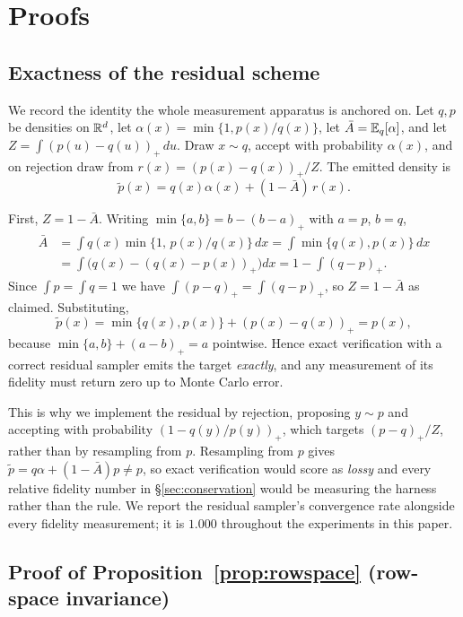 \section{Proofs}
\label{app:proofs}

\subsection{Exactness of the residual scheme}
\label{app:exactness}

We record the identity the whole measurement apparatus is anchored on. Let $q, p$ be densities on
$\mathbb{R}^d$, let $\alpha(x) = \min\{1, p(x)/q(x)\}$, let $\bar{A} = \mathbb{E}_{q}[\alpha]$, and let
$Z = \int (p(u) - q(u))_+ \, du$. Draw $x \sim q$, accept with probability $\alpha(x)$, and on
rejection draw from $r(x) = (p(x) - q(x))_+ / Z$. The emitted density is
\[
\tilde{p}(x) = q(x)\alpha(x) + (1 - \bar{A})\,r(x).
\]

First, $Z = 1 - \bar{A}$. Writing $\min\{a,b\} = b - (b-a)_+$ with $a = p$, $b = q$,
\begin{align*}
\bar{A} &= \int q(x)\min\{1,\, p(x)/q(x)\} \, dx
         = \int \min\{q(x), p(x)\} \, dx \\
        &= \int \bigl(q(x) - (q(x) - p(x))_+\bigr) dx
         = 1 - \int (q - p)_+ .
\end{align*}
Since $\int p = \int q = 1$ we have $\int (p-q)_+ = \int (q-p)_+$, so $Z = 1 - \bar A$ as claimed.
Substituting,
\[
\tilde{p}(x) = \min\{q(x), p(x)\} + (p(x) - q(x))_+ = p(x),
\]
because $\min\{a,b\} + (a - b)_+ = a$ pointwise. Hence exact verification with a correct residual
sampler emits the target \emph{exactly}, and any measurement of its fidelity must return zero up to
Monte Carlo error.

This is why we implement the residual by rejection, proposing $y \sim p$ and accepting with
probability $(1 - q(y)/p(y))_+$, which targets $(p-q)_+/Z$, rather than by resampling from $p$.
Resampling from $p$ gives $\tilde p = q\alpha + (1-\bar A)p \ne p$, so exact verification would score
as \emph{lossy} and every relative fidelity number in \S\ref{sec:conservation} would be measuring the
harness rather than the rule. We report the residual sampler's convergence rate alongside every
fidelity measurement; it is $1.000$ throughout the experiments in this paper.

\subsection{Proof of Proposition~\ref{prop:rowspace} (row-space invariance)}

